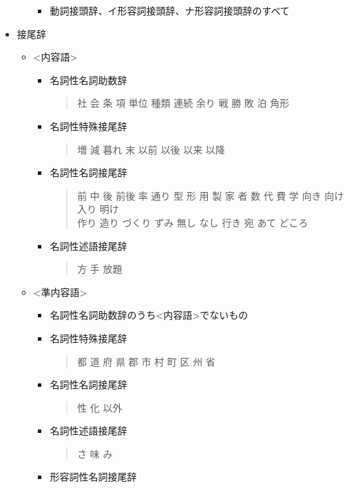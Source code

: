 \documentclass[a4j]{jarticle}
\newcommand{\sm}[1]{\textless #1\textgreater}
\begin{document}
\begin{itemize}
\begin{itemize}
\begin{itemize}
	       \item 動詞接頭辞、イ形容詞接頭辞、ナ形容詞接頭辞のすべて
	      \end{itemize}
       \end{itemize}
 \item 接尾辞
       \begin{itemize}
	\item \sm{内容語}
	      \begin{itemize}
	       \item 名詞性名詞助数辞
		     \begin{quote}
		      社 会 条 項 単位 種類 連続 余り 戦 勝 敗 泊 角形
		     \end{quote}
	       \item 名詞性特殊接尾辞
		     \begin{quote}
		      増 減 暮れ 末 以前 以後 以来 以降
		     \end{quote}
	       \item 名詞性名詞接尾辞
		     \begin{quote}
		      前 中 後 前後 率 通り 型 形 用 製 家 者 数 代 費 学 向き 向け 入り 明け \\ 作り 造り づくり ずみ 無し なし 行き 宛 あて どころ
		     \end{quote}
	       \item 名詞性述語接尾辞
		     \begin{quote}
		      方 手 放題
		     \end{quote}
     	      \end{itemize}
	\item \sm{準内容語}
	      \begin{itemize}
	       \item 名詞性名詞助数辞のうち\sm{内容語}でないもの
	       \item 名詞性特殊接尾辞
		     \begin{quote}
		      都 道 府 県 郡 市 村 町 区 州 省
		     \end{quote}
     	       \item 名詞性名詞接尾辞
		     \begin{quote}
		      性 化 以外
		     \end{quote}
	       \item 名詞性述語接尾辞
		     \begin{quote}
		      さ 味 み
		     \end{quote}
     	       \item 形容詞性名詞接尾辞
		     \begin{quote}

\end{quote}
\end{itemize}
\end{itemize}
\end{itemize}
\end{document}
